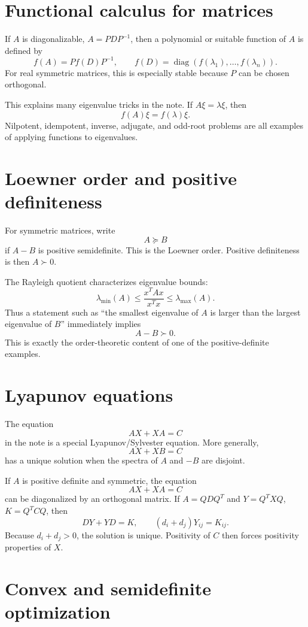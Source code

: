 \section{Functional calculus for matrices}

If $A$ is diagonalizable, $A=PDP^{-1}$, then a polynomial or suitable function of $A$ is defined by
\[
  f(A)=Pf(D)P^{-1},\qquad f(D)=\operatorname{diag}(f(\lambda_1),\ldots,f(\lambda_n)).
\]
For real symmetric matrices, this is especially stable because $P$ can be chosen orthogonal.

This explains many eigenvalue tricks in the note.  If $A\xi=\lambda\xi$, then
\[
  f(A)\xi=f(\lambda)\xi.
\]
Nilpotent, idempotent, inverse, adjugate, and odd-root problems are all examples of applying functions to eigenvalues.

\section{Loewner order and positive definiteness}

For symmetric matrices, write
\[
  A\succeq B
\]
if $A-B$ is positive semidefinite.  This is the Loewner order.  Positive definiteness is then $A\succ0$.

The Rayleigh quotient characterizes eigenvalue bounds:
\[
  \lambda_{\min}(A)\le \frac{x^TAx}{x^Tx}\le \lambda_{\max}(A).
\]
Thus a statement such as ``the smallest eigenvalue of $A$ is larger than the largest eigenvalue of $B$'' immediately implies
\[
  A-B\succ0.
\]
This is exactly the order-theoretic content of one of the positive-definite examples.

\section{Lyapunov equations}

The equation
\[
  AX+XA=C
\]
in the note is a special Lyapunov/Sylvester equation.  More generally,
\[
  AX+XB=C
\]
has a unique solution when the spectra of $A$ and $-B$ are disjoint.

If $A$ is positive definite and symmetric, the equation
\[
  AX+XA=C
\]
can be diagonalized by an orthogonal matrix.  If $A=QDQ^T$ and $Y=Q^TXQ$, $K=Q^TCQ$, then
\[
  DY+YD=K,\qquad (d_i+d_j)Y_{ij}=K_{ij}.
\]
Because $d_i+d_j>0$, the solution is unique.  Positivity of $C$ then forces positivity properties of $X$.

\section{Convex and semidefinite optimization}

